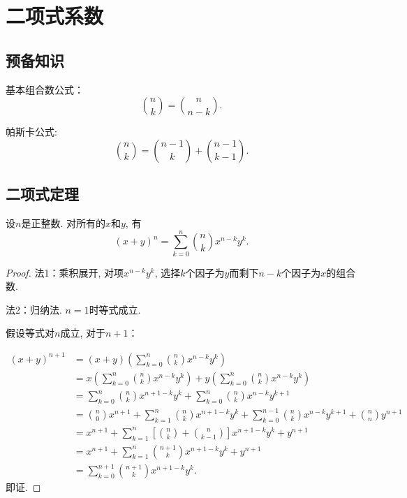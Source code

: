 \chapter{二项式系数}
\section*{预备知识}
基本组合数公式：
\[\binom{n}{k} = \binom{n}{n-k}.  \]

帕斯卡公式:
\[\binom{n}{k} = \binom{n-1}{k}+\binom{n-1}{k-1}.  \]

\section{二项式定理}
\begin{theorem}[二项式定理]
    设\(n\)是正整数.  对所有的\(x\)和\(y\),  有\[(x + y)^n = \sum_{k=0}^{n} \binom{n}{k} x^{n-k} y^k.  \]
\end{theorem}
\begin{proof}
    法1：乘积展开, 对项\(x^{n-k}y^k\), 选择\(k\)个因子为\(y\)而剩下\(n-k\)个因子为\(x\)的组合数.

    法2：归纳法.  \(n=1\)时等式成立.

    假设等式对\(n\)成立, 对于\(n+1\)：

    \begin{align*}
        (x + y)^{n+1} & = (x + y) \left( \sum_{k=0}^{n} \binom{n}{k} x^{n-k} y^k \right)                                                                          \\
                      & = x \left( \sum_{k=0}^{n} \binom{n}{k} x^{n-k} y^k \right) + y \left( \sum_{k=0}^{n} \binom{n}{k} x^{n-k} y^k \right)                     \\
                      & = \sum_{k=0}^{n} \binom{n}{k} x^{n+1-k} y^k + \sum_{k=0}^{n} \binom{n}{k} x^{n-k} y^{k+1}                                                 \\
                      & = \binom{n}{0} x^{n+1} + \sum_{k=1}^{n} \binom{n}{k} x^{n+1-k} y^k + \sum_{k=0}^{n-1} \binom{n}{k} x^{n-k} y^{k+1} + \binom{n}{n} y^{n+1} \\
                      & = x^{n+1} + \sum_{k=1}^{n} \left[ \binom{n}{k} + \binom{n}{k-1} \right] x^{n+1-k} y^k + y^{n+1}                                           \\
                      & =x^{n+1} + \sum_{k=1}^{n} \binom{n+1}{k} x^{n+1-k} y^k + y^{n+1}                                                                          \\
                      & =\sum_{k=0}^{n+1} \binom{n+1}{k} x^{n+1-k} y^k.
    \end{align*}
    即证.
\end{proof}
